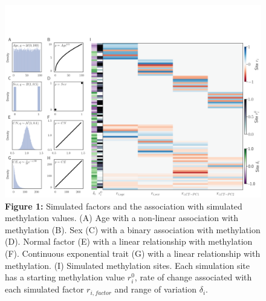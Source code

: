 \documentclass{article}
\begin{document}
{\begin{center}
    \begin{figure}
    \includegraphics[scale=.25]{Figures/Figure1.png}    
    \footnotesize
    \caption*{\small \textbf{Figure 1:} Simulated factors and the association with simulated methylation values. (A) 
    Age with a non-linear association with methylation (B). Sex (C) with a binary association with methylation (D). 
    Normal factor (E) with a linear relationship with methylation (F). Continuous exponential trait (G) with a linear 
    relationship with methylation. (I) Simulated methylation sites. Each simulation site has a starting methylation 
    value $r^0_i$, rate of change associated with each simulated factor $r_{i, factor}$ and range of 
    variation $\delta_i$. }
    \end{figure}
\end{center}

}
\end{document}
